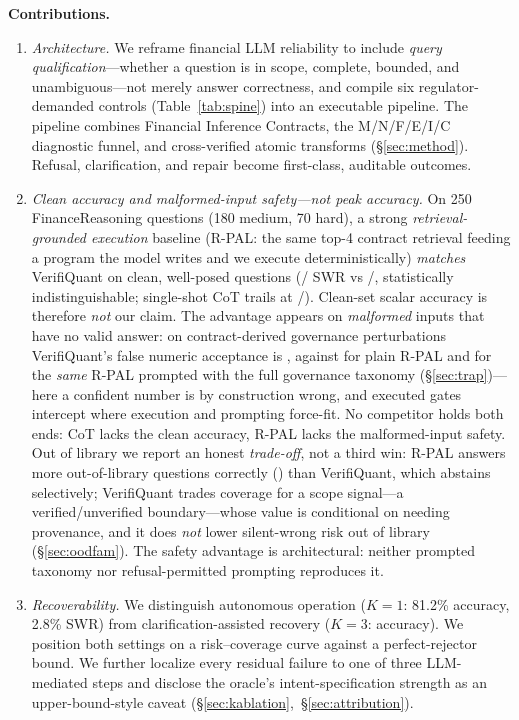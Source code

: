 \textbf{Contributions.}

\begin{enumerate}
    \item \emph{Architecture.}
    We reframe financial LLM reliability to include \emph{query qualification}---whether a question is in scope, complete, bounded, and unambiguous---not merely answer correctness, and compile six regulator-demanded controls (Table~\ref{tab:spine}) into an executable pipeline.
    The pipeline combines Financial Inference Contracts, the M/N/F/E/I/C diagnostic funnel, and cross-verified atomic transforms (\S\ref{sec:method}).
    Refusal, clarification, and repair become first-class, auditable outcomes.

    \item \emph{Clean accuracy \emph{and} malformed-input safety---not peak accuracy.}
    On 250 FinanceReasoning \cite{tang2025financereasoning} questions (180 medium, 70 hard), a strong \emph{retrieval-grounded execution} baseline (R-PAL: the same top-4 contract retrieval feeding a program the model writes and we execute deterministically) \emph{matches} VerifiQuant on clean, well-posed questions (\rpalAccAll{}/\rpalSWRAll{} SWR vs \vqAccAll{}/\vqSWRAll{}, statistically indistinguishable; single-shot CoT trails at \cotAccAll{}/\cotSWRAll{}).
    Clean-set scalar accuracy is therefore \emph{not} our claim.
    The advantage appears on \emph{malformed} inputs that have no valid answer: on contract-derived governance perturbations VerifiQuant's false numeric acceptance is \govVQfnar{}, against \govPlainFnar{} for plain R-PAL and \govPromptFnar{} for the \emph{same} R-PAL prompted with the full governance taxonomy (\S\ref{sec:trap})---here a confident number is by construction wrong, and executed gates intercept where execution and prompting force-fit.
    No competitor holds both ends: CoT lacks the clean accuracy, R-PAL lacks the malformed-input safety.
    Out of library we report an honest \emph{trade-off}, not a third win: R-PAL answers more out-of-library questions correctly (\oodRPALcorrOOD{}) than VerifiQuant, which abstains selectively; VerifiQuant trades coverage for a scope signal---a verified/unverified boundary---whose value is conditional on needing provenance, and it does \emph{not} lower silent-wrong risk out of library (\S\ref{sec:oodfam}).
    The safety advantage is architectural: neither prompted taxonomy nor refusal-permitted prompting reproduces it.

    \item \emph{Recoverability.}
    We distinguish autonomous operation ($K{=}1$: 81.2\% accuracy, 2.8\% SWR) from clarification-assisted recovery ($K{=}3$: \vqAccAll{} accuracy).
    We position both settings on a risk--coverage curve against a perfect-rejector bound.
    We further localize every residual failure to one of three LLM-mediated steps and disclose the oracle's intent-specification strength as an upper-bound-style caveat (\S\ref{sec:kablation},~\S\ref{sec:attribution}).
\end{enumerate}


